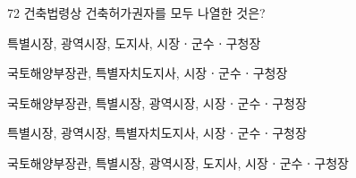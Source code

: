 \begin{question}{72}
건축법령상 건축허가권자를 모두 나열한 것은?
\begin{choices}
  \item 특별시장, 광역시장, 도지사, 시장ㆍ군수ㆍ구청장
  \item 국토해양부장관, 특별자치도지사, 시장ㆍ군수ㆍ구청장
  \item 국토해양부장관, 특별시장, 광역시장, 시장ㆍ군수ㆍ구청장
  \item 특별시장, 광역시장, 특별자치도지사, 시장ㆍ군수ㆍ구청장
  \item 국토해양부장관, 특별시장, 광역시장, 도지사, 시장ㆍ군수ㆍ구청장
\end{choices}
\end{question}
